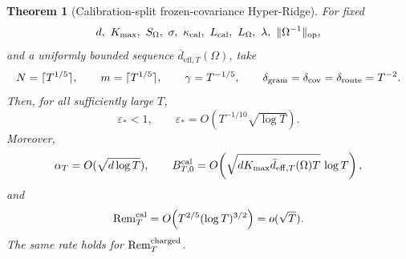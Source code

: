 \documentclass{article} %
\newtheorem{theorem}{Theorem}
\begin{document}
\begin{theorem}[Calibration-split frozen-covariance Hyper-Ridge]
For fixed
\[
d,\ K_{\max},\ S_\Omega,\ \sigma,\ \kappa_{\rm cal},\
L_{\rm cal},\ L_\Omega,\ \lambda,\ \|\Omega^{-1}\|_{\mathrm{op}},
\]
and a uniformly bounded sequence
\(\bar d_{\mathrm{eff},T}(\Omega)\), take
\[
N=\lceil T^{1/5}\rceil,
\qquad
m=\lceil T^{1/5}\rceil,
\qquad
\gamma=T^{-1/5},
\qquad
\delta_{\rm gram}=\delta_{\rm cov}=\delta_{\rm route}=T^{-2}.
\]
Then, for all sufficiently large \(T\),
\[
\varepsilon_*<1,
\qquad
\varepsilon_*
=
O\!\left(T^{-1/10}\sqrt{\log T}\right).
\]
Moreover,
\[
\alpha_T=O(\sqrt{d\log T}),
\qquad
B_{T,0}^{\rm cal}
=
O\!\left(
\sqrt{dK_{\max}\bar d_{\mathrm{eff},T}(\Omega)T}\,\log T
\right),
\]
and
\[
\operatorname{Rem}_T^{\rm cal}
=
O\!\left(T^{2/5}(\log T)^{3/2}\right)
=
o(\sqrt{T}).
\]
The same rate holds for
\(\operatorname{Rem}_T^{\rm charged}\).
\end{theorem}
\end{document}
